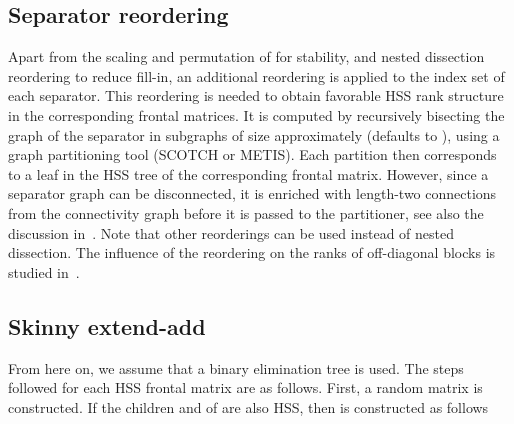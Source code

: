 \documentclass{article}
\begin{document}
\subsection{Separator reordering}\label{sec:sep_reorder}
Apart from the scaling and permutation of  for stability, and
nested dissection reordering to reduce fill-in, an additional
reordering is applied to the index set of each separator. This
reordering is needed to obtain favorable HSS rank structure in the
corresponding frontal matrices. It is computed by recursively
bisecting the graph of the separator in subgraphs of size
approximately  (defaults to ), using a graph partitioning
tool (SCOTCH or METIS). Each partition then corresponds to a leaf in
the HSS tree of the corresponding frontal matrix. However, since a
separator graph can be disconnected, it is enriched with length-two
connections from the connectivity graph before it is passed to the
partitioner, see also the discussion
in~\cite{napov2013algebraic}. Note that other reorderings can be used
instead of nested dissection. The influence of the reordering on the
ranks of off-diagonal blocks is studied
in~\cite{weisbecker2013improving}.

\subsection{Skinny extend-add}\label{sec:skinny-extend-add}
From here on, we assume that a binary elimination tree is used. The
steps followed for each HSS frontal matrix  are as
follows. First, a random matrix  is constructed. If the children  and  of  are
also HSS, then  is constructed as follows
\end{document}
